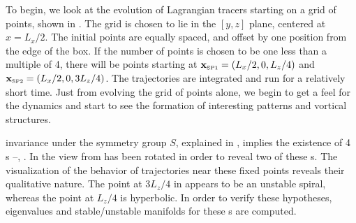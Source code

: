 \documentclass[lineno]{jfm}
\begin{document}
To begin, we look at the evolution of Lagrangian tracers starting on a 
grid of points, shown in . The grid is chosen to lie 
in the $[y,z]$ plane, centered at $x = L_x/2$. The initial points are 
equally spaced, and offset by one position from the edge of the box. If 
the number of points is chosen to be one less than a multiple of 4, there 
will be points starting at $\xSP{1}=(L_x/2,0,L_z/4)$ and 
$\xSP{2}=(L_x/2,0,3L_z/4)$. The trajectories are integrated 
and run for a relatively short time. Just from evolving the 
grid of points alone, we begin to get a feel for the dynamics and start 
to see the formation of interesting patterns and vortical structures. 

{\tEQtwo} invariance under the symmetry group $S$, explained  in 
, implies the existence of 4 \stagp s 
--, . In  the view 
from  has been rotated in order to reveal two of 
these \stagp s. The visualization of the behavior of trajectories near 
these fixed points reveals their  qualitative nature. The point at 
$3L_z/4$ in  appears to be an unstable spiral, 
whereas the point at $L_z/4$ is hyperbolic. In order to verify these 
hypotheses, eigenvalues and stable/unstable manifolds for these \stagp s 
are computed. 
\end{document}
